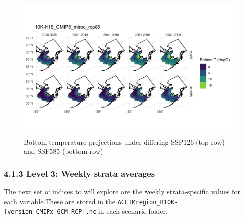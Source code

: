 \documentclass[
]{article}
\begin{document}
\begin{figure}
\centering
\includegraphics{Figs/mn_BT.jpg}
\caption{Bottom temperature projections under differing SSP126 (top row)
and SSP585 (bottom row)}
\end{figure}

\hypertarget{level-3-weekly-strata-averages}{%
\subsubsection{4.1.3 Level 3: Weekly strata
averages}\label{level-3-weekly-strata-averages}}

The next set of indices to will explore are the weekly strata-specific
values for each variable.These are stored in the
\texttt{ACLIMregion\_B10K-{[}version\_CMIPx\_GCM\_RCP{]}.nc} in each
scenario folder.
\end{document}
